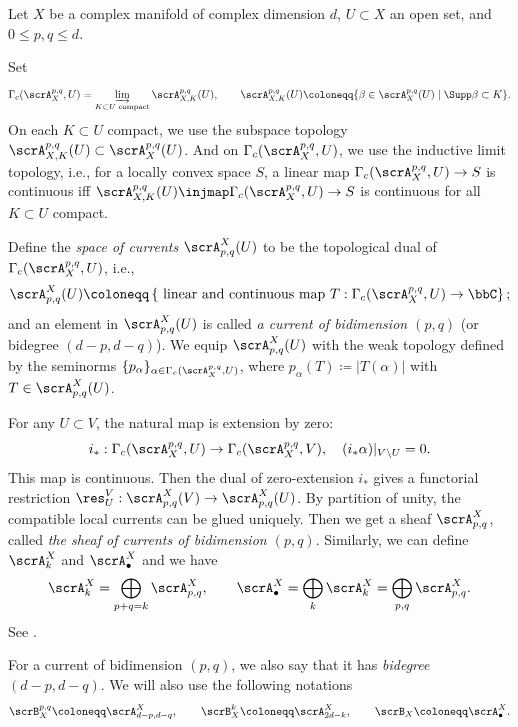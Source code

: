 \begin{construction}[label=\labelNFM{constr:currents}, status=draft, tag=0000000]
	Let $X$ be a complex manifold of complex dimension $d$, $U \subset X$ an open set, and $0 \leq p,q \leq d$.

	Set
	\[ \Gamma_c(\scrA_X^{p,q},U) = \varinjlim_{K \subset U \text{ compact}}\scrA_{X,K}^{p,q}(U),
		\qquad \scrA_{X,K}^{p,q}(U) \coloneqq \{\beta \in \scrA_X^{p,q}(U)\mid\Supp\beta \subset K\}. \]
	On each $K \subset U$ compact, we use the subspace topology $\scrA_{X,K}^{p,q}(U) \subset \scrA_{X}^{p,q}(U)$.
	And on $\Gamma_c(\scrA_X^{p,q},U)$, we use the inductive limit topology, i.e., for a locally convex space $S$, a linear map $\Gamma_c(\scrA_X^{p,q},U) \to S$ is continuous iff $\scrA_{X,K}^{p,q}(U) \injmap \Gamma_c(\scrA_X^{p,q},U) \to S$ is continuous for all $K \subset U$ compact.


	Define the \emph{space of currents} $\scrA_{p,q}^X(U)$ to be the topological dual of $\Gamma_c(\scrA_X^{p,q},U)$, i.e.,
	\[ \scrA_{p,q}^X(U) \coloneqq \left\{\text{ linear and continuous map } T: \Gamma_c(\scrA_X^{p,q},U) \to \bbC \right\}; \]
	and an element in $\scrA_{p,q}^X(U)$ is called \emph{a current of bidimension $(p,q)$} (or bidegree $(d-p,d-q)$).
	We equip $\scrA_{p,q}^X(U)$ with the weak topology defined by the seminorms $\{p_\alpha\}_{\alpha \in \Gamma_c(\scrA_X^{p,q},U)}$, where $p_\alpha(T) \coloneqq |T(\alpha)|$ with $T \in \scrA_{p,q}^X(U)$.

	For any $U \subset V$, the natural map is extension by zero:
	\[ i_*: \Gamma_c(\scrA_X^{p,q},U) \to \Gamma_c(\scrA_X^{p,q},V), \quad (i_*\alpha)|_{V\setminus U} = 0. \]
	This map is continuous.
	Then the dual of zero-extension $i_*$ gives a functorial restriction $\res^V_U: \scrA_{p,q}^X(V) \to \scrA_{p,q}^X(U)$.
	By partition of unity, the compatible local currents can be glued uniquely.
	Then we get a sheaf $\scrA_{p,q}^X$, called \emph{the sheaf of currents of bidimension $(p,q)$}.
	Similarly, we can define $\scrA_k^X$ and $\scrA_\bullet^X$ and we have
	\[ \scrA_k^X = \bigoplus_{p+q = k} \scrA_{p,q}^X, \qquad \scrA^X_\bullet = \bigoplus_k \scrA_k^X = \bigoplus_{p,q} \scrA_{p,q}^X. \]
	See \cite[Chapter~I, \S 2 and \S 3]{Demailly-2012-ComplexAnalyticDifferential}.

	For a current of bidimension $(p,q)$, we also say that it has \emph{bidegree $(d-p,d-q)$}.
	We will also use the following notations
	\[ \scrB_X^{p,q} \coloneqq \scrA_{d-p,d-q}^X, \qquad \scrB_X^{k} \coloneqq \scrA_{2d-k}^X, \qquad \scrB_X \coloneqq \scrA^X_\bullet. \]

\end{construction}

